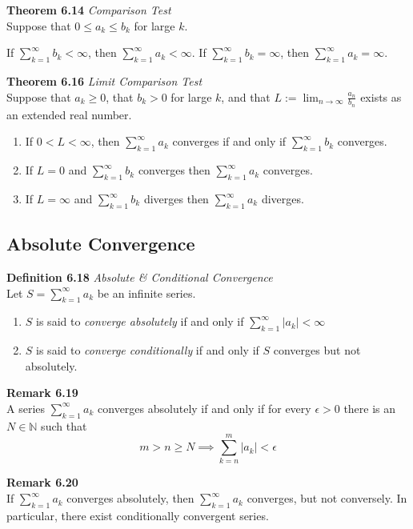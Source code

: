 \documentclass[8pt,landscape]{article}
\begin{document}
\begin{multicols}{3}
    \textbf{Theorem 6.14} \emph{Comparison Test} \\
    Suppose that $0 \leq a_k \leq b_k$ for large $k$.
    \begin{enumerate}
        If $\sum_{k=1}^\infty b_k < \infty$, then $\sum_{k=1}^\infty a_k < \infty$.
        If $\sum_{k=1}^\infty b_k = \infty$, then $\sum_{k=1}^\infty a_k = \infty$.
\end{enumerate}

\textbf{Theorem 6.16} \emph{Limit Comparison Test} \\
Suppose that $a_k \geq 0$, that $b_k > 0$ for large $k$, and that
$L := \lim_{n \to \infty} \frac{a_n}{b_n}$ exists as an extended real number.
\begin{enumerate}
    \item If $0 < L < \infty$, then $\sum_{k=1}^\infty a_k$ converges if and only if
        $\sum_{k=1}^\infty b_k$ converges.
    \item If $L = 0$ and $\sum_{k=1}^\infty b_k$ converges then
        $\sum_{k=1}^\infty a_k$ converges.
    \item If $L = \infty$ and $\sum_{k=1}^\infty b_k$ diverges then
        $\sum_{k=1}^\infty a_k$ diverges.
\end{enumerate}

\subsection{Absolute Convergence}

\textbf{Definition 6.18} \emph{Absolute \& Conditional Convergence} \\
Let $S = \sum_{k=1}^\infty a_k$ be an infinite series.
\begin{enumerate}
    \item $S$ is said to \emph{converge absolutely} if and only if
        $\sum_{k=1}^\infty |a_k| < \infty$
    \item $S$ is said to \emph{converge conditionally} if and only if $S$ converges
        but not absolutely.
\end{enumerate}

\textbf{Remark 6.19} \\
A series $\sum_{k=1}^\infty a_k$ converges absolutely if and only if for every
$\epsilon > 0$ there is an $N \in \mathbb{N}$ such that
\[
    m > n \geq N \implies \sum_{k=n}^m |a_k| < \epsilon
\]

\textbf{Remark 6.20} \\
If $\sum_{k=1}^\infty a_k$ converges absolutely, then $\sum_{k=1}^\infty a_k$
converges, but not conversely.
In particular, there exist conditionally convergent series.



\end{multicols}
\end{document}
